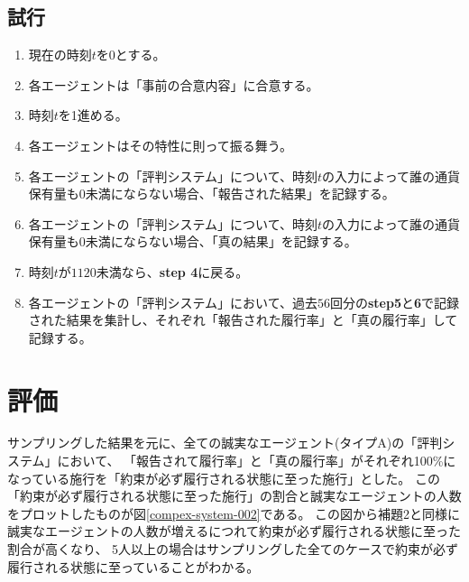   \subsection{試行}
    \begin{enumerate}
      \item 現在の時刻$t$を$0$とする。
      \item 各エージェントは「事前の合意内容」に合意する。
      \item 時刻$t$を1進める。
      \item 各エージェントはその特性に則って振る舞う。
      \item 各エージェントの「評判システム」について、時刻$t$の入力によって誰の通貨保有量も0未満にならない場合、「報告された結果」を記録する。
      \item 各エージェントの「評判システム」について、時刻$t$の入力によって誰の通貨保有量も0未満にならない場合、「真の結果」を記録する。
      \item 時刻$t$が$1120$未満なら、\textbf{step 4}に戻る。
      \item 各エージェントの「評判システム」において、過去$56$回分の\textbf{step5}と\textbf{6}で記録された結果を集計し、それぞれ「報告された履行率」と「真の履行率」して記録する。
    \end{enumerate}

\section{評価}
サンプリングした結果を元に、全ての誠実なエージェント(タイプA)の「評判システム」において、
「報告されて履行率」と「真の履行率」がそれぞれ100\%になっている施行を「約束が必ず履行される状態に至った施行」とした。
この「約束が必ず履行される状態に至った施行」の割合と誠実なエージェントの人数をプロットしたものが図\ref{compex-system-002}である。
この図から補題2と同様に誠実なエージェントの人数が増えるにつれて約束が必ず履行される状態に至った割合が高くなり、
5人以上の場合はサンプリングした全てのケースで約束が必ず履行される状態に至っていることがわかる。


